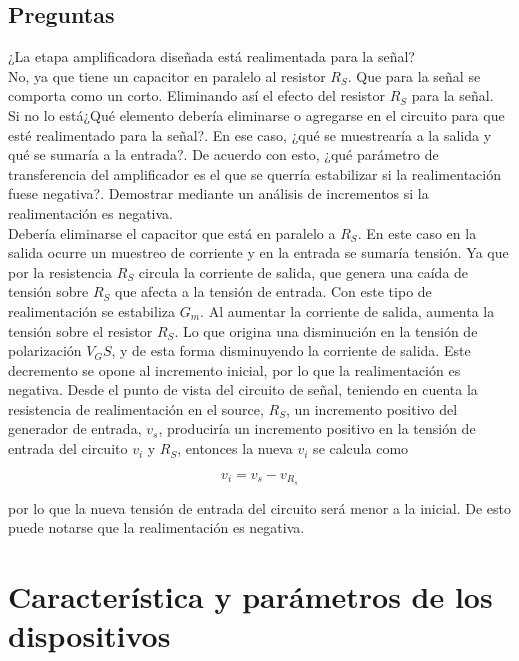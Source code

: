 \documentclass[10pt,spanish,a4paper,notitlepage]{article}
\begin{document}
\subsection{Preguntas}

{\color{OliveGreen}
¿La etapa amplificadora diseñada está realimentada para la señal?}\\

No, ya que tiene un capacitor en paralelo al resistor  $R_S$. Que para 
la señal se comporta como un corto. Eliminando así el efecto del resistor $R_S$ para la señal.\\

{\color{OliveGreen}
Si no lo está¿Qué elemento debería eliminarse o agregarse en el circuito para que esté
realimentado para la señal?. En ese caso, ¿qué se muestrearía a la salida y qué se 
sumaría a la entrada?. De acuerdo con esto, ¿qué parámetro de transferencia del amplificador
es el que se querría estabilizar si la realimentación fuese negativa?. Demostrar mediante
un análisis de incrementos si la realimentación es negativa.}\\

Debería eliminarse el capacitor que está en paralelo a $R_S$.
En este caso en la salida ocurre un muestreo de corriente y en la entrada se sumaría tensión.
Ya que por la resistencia $R_S$ circula la corriente de salida, que genera una caída de tensión
sobre $R_S$ que afecta a la tensión de entrada.
Con este tipo de realimentación se estabiliza $G_m$.
Al aumentar la corriente de salida, aumenta la tensión sobre el resistor $R_S$. Lo que
origina una disminución en la tensión de polarización $V_GS$, y de esta forma disminuyendo
la corriente de salida. Este decremento se opone al incremento inicial, por lo que
la realimentación es negativa. Desde el punto de vista del circuito de señal, teniendo en cuenta la resistencia de realimentación en el source, $R_S$, un incremento positivo del generador de entrada, $v_s$, produciría un incremento positivo en la tensión de entrada del circuito $v_i$ y $R_S$, entonces la nueva $v_i$ se calcula como

\begin{equation}
    v_{i}=v_{s}-v_{R_s}
\end{equation}

por lo que la nueva tensión de entrada del circuito será menor a la inicial. De esto puede notarse que la realimentación es negativa.




\section{Característica y parámetros de los dispositivos}
\end{document}
